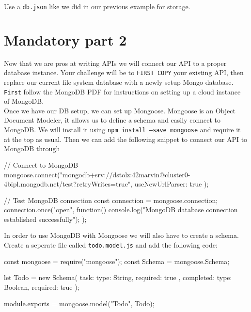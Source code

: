 \documentclass{42-en}
\begin{document}
Use a \texttt{db.json} like we did in our previous example for storage.

\newpage

\chapter{Mandatory part 2}

Now that we are pros at writing APIs we will connect our API to a proper database instance. Your challenge will be to \texttt{FIRST COPY} your existing API, then replace our current file system database with a newly setup Mongo database.\\

\texttt{First} follow the MongoDB PDF for instructions on setting up a cloud instance of MongoDB.\\

Once we have our DB setup, we can set up Mongoose. Mongoose is an Object Document Modeler, it allows us to define a schema and easily connect to MongoDB. We will install it using \texttt{npm install --save mongoose} and require it at the top as usual. Then we can add the following snippet to connect our API to MongoDB through 

\begin{42jscode}
	// Connect to MongoDB
	mongoose.connect("mongodb+srv://dstolz:42marvin@cluster0-4bipl.mongodb.net/test?retryWrites=true",
	{ useNewUrlParser: true }
	);
	
	// Test MongoDB connection
	const connection = mongoose.connection;
	connection.once("open", function() {
		console.log("MongoDB database connection established successfully");
		});
	\end{42jscode}
	
	In order to use MongoDB with Mongoose we will also have to create a schema. Create a seperate file called \texttt{todo.model.js} and add the following code:
	
	\begin{42jscode}
		const mongoose = require("mongoose");
		const Schema = mongoose.Schema;
		
		let Todo = new Schema({
			task: {
				type: String,
				required: true
				},
				completed: {
					type: Boolean,
					required: true
					}
					});
					
					module.exports = mongoose.model("Todo", Todo);
				\end{42jscode}
				
\end{document}
